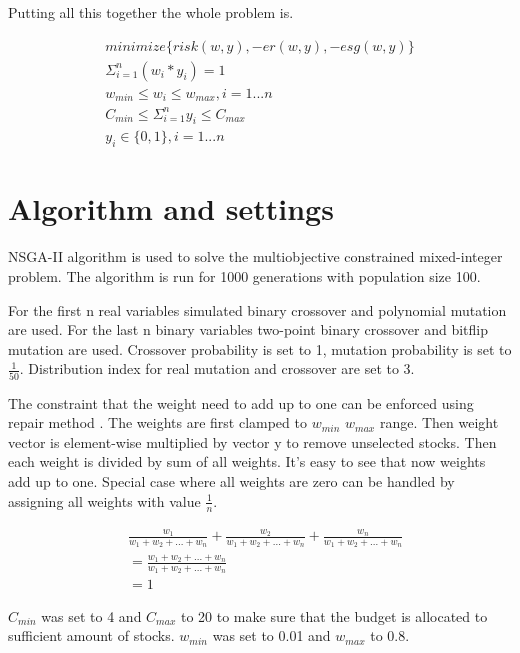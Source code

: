 \documentclass[11pt]{article} %
\begin{document}
Putting all this together the whole problem is.

\begin{equation}
\begin{split}
minimize \{ risk(w,y), -er(w,y), -esg(w,y) \}\\
\Sigma_{i=1}^n (w_i * y_i) = 1\\
w_{min} \leq w_i \leq w_{max}, i = 1...n\\
C_{min} \leq \Sigma_{i=1}^n y_i \leq C_{max}\\
y_i \in \{0,1\}, i = 1...n\
\end{split}
\end{equation}


\section{Algorithm and settings}

NSGA-II algorithm is used to solve the multiobjective constrained mixed-integer problem. The algorithm is run for 1000 generations with population size 100.

For the first n real variables simulated binary crossover and polynomial mutation are used. For the last n binary variables two-point binary crossover and bitflip mutation are used. Crossover probability is set to 1, mutation probability is set to $\frac{1}{50}$. Distribution index for real mutation and crossover are set to 3. 

The constraint that the weight need to add up to one can be enforced using repair method \cite{kaucic2019portfolio}. The weights are first clamped to $w_{min}$ $w_{max}$ range. Then weight vector is element-wise multiplied by vector y to remove unselected stocks. Then each weight is divided by sum of all weights. It's easy to see that now weights add up to one. Special case where all weights are zero can be handled by assigning all weights with value $\frac{1}{n}$.

\begin{equation}
\begin{split}
&\frac{w_1}{w_1 + w_2 + ... + w_n} + \frac{w_2}{w_1 + w_2 + ... + w_n} + \frac{w_n}{w_1 + w_2 + ... + w_n}\\
&= \frac{w_1 + w_2 + ...  +w_n}{w_1 + w_2 + ... + w_n}\\
&= 1
\end{split}
\end{equation}

$C_{min}$ was set to 4 and $C_{max}$ to 20 to make sure that the budget is allocated to sufficient amount of stocks. $w_{min}$ was set to 0.01 and $w_{max}$ to 0.8. 
\end{document}
